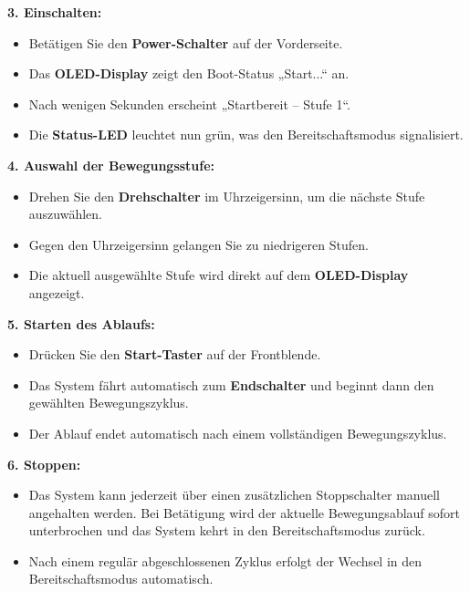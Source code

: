 \documentclass[a4paper,12pt]{report}
\begin{document}
		
		
		\noindent\textbf{3. Einschalten:}
		
		\begin{itemize}[leftmargin=1.5em]
		\item Betätigen Sie den \textbf{Power-Schalter} auf der Vorderseite. 
		\item Das \textbf{OLED-Display} zeigt den Boot-Status „Start...“ an. 
		\item Nach wenigen Sekunden erscheint „Startbereit – Stufe 1“. 
		\item Die \textbf{Status-LED} leuchtet nun grün, was den Bereitschaftsmodus signalisiert. \\
    	\end{itemize}
		
		\noindent\textbf{4. Auswahl der Bewegungsstufe:}
		\begin{itemize}[leftmargin=1.5em]
		
		\item Drehen Sie den \textbf{Drehschalter} im Uhrzeigersinn, um die nächste Stufe auszuwählen. 
		\item Gegen den Uhrzeigersinn gelangen Sie zu niedrigeren Stufen. 
		\item Die aktuell ausgewählte Stufe wird direkt auf dem \textbf{OLED-Display} angezeigt. \\
    	\end{itemize}
		
		\noindent\textbf{5. Starten des Ablaufs:}
		\begin{itemize}[leftmargin=1.5em]
		
		\item Drücken Sie den \textbf{Start-Taster} auf der Frontblende. 
		\item Das System fährt automatisch zum \textbf{Endschalter} und beginnt dann den gewählten Bewegungszyklus. 
		\item Der Ablauf endet automatisch nach einem vollständigen Bewegungszyklus. \\
    	\end{itemize}
		
		\noindent\textbf{6. Stoppen:}
		\begin{itemize}[leftmargin=1.5em]
		
		\item Das System kann jederzeit über einen zusätzlichen Stoppschalter manuell angehalten werden. Bei Betätigung wird der aktuelle Bewegungsablauf sofort unterbrochen und das System kehrt in den Bereitschaftsmodus zurück.	
		\item Nach einem regulär abgeschlossenen Zyklus erfolgt der Wechsel in den Bereitschaftsmodus automatisch.

		
    	\end{itemize}
    \newpage
	
\end{document}
